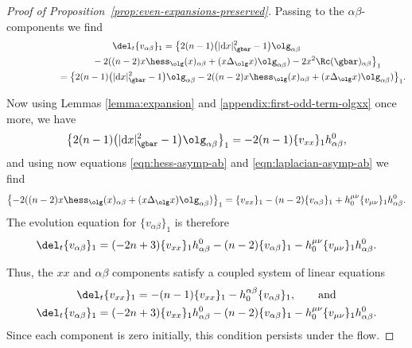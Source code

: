 \begin{proof}[Proof of Proposition~\ref{prop:even-expansions-preserved}]
Passing to the $\alpha \beta$-components we find
\begin{gather*}
\del_t \{ v_{\alpha \beta} \}_{1} =\big\{ 2 (n-1) \big(|{\rm d}x|^2_{\gbar} -1\big) \olg_{{\alpha \beta}} \\
\hphantom{\del_t \{ v_{\alpha \beta} \}_{1} =}{} -2 ( (n-2) x \hess_{\olg} (x)_{{\alpha \beta}} + (x \Delta_{\olg} x) \olg_{{\alpha \beta}} ) -2 x^2 \Rc(\gbar)_{{\alpha \beta}}\big\}_1 \nonumber \\
\hphantom{\del_t \{ v_{\alpha \beta} \}_{1}}{} =\big\{ 2 (n-1)\big(|{\rm d}x|^2_{\gbar} -1\big)\olg_{{\alpha \beta}} -2 ( (n-2) x \hess_{\olg} (x)_{{\alpha \beta}} + (x \Delta_{\olg} x) \olg_{{\alpha \beta}} )\big\}_1.
\end{gather*}

Now using Lemmas \ref{lemma:expansion} and \ref{appendix:first-odd-term-olgxx} once more, we have
\begin{gather*}
\big\{ 2 (n-1) \big(|{\rm d}x|^2_{\gbar} -1\big) \olg_{{\alpha \beta}} \big\}_1 = -2(n-1)\{v_{xx}\}_1 h^0_{\alpha \beta},
\end{gather*}
and using now equations \eqref{eqn:hess-asymp-ab} and \eqref{eqn:laplacian-asymp-ab} we find
\begin{gather*}
\big\{{-}2 ((n-2) x \hess_{\olg} (x)_{{\alpha \beta}} + (x \Delta_{\olg} x) \olg_{{\alpha \beta}} ) \big\}_1 = \{v_{xx}\}_1 - (n-2) \{v_{\alpha \beta}\}_1 + h_0^{\mu \nu} \{v_{\mu\nu}\}_1 h^0_{\alpha \beta}.
\end{gather*}
The evolution equation for $\{v_{\alpha \beta}\}_1$ is therefore
\begin{gather*}
\del_t \{v_{\alpha \beta}\}_1 = (-2n+3)\{v_{xx}\}_1 h^0_{\alpha \beta} - (n-2) \{v_{\alpha \beta}\}_1 - h_0^{\mu \nu} \{v_{\mu\nu}\}_1 h^0_{\alpha \beta}.
\end{gather*}

Thus, the $xx$ and $\alpha\beta$ components satisfy a coupled system of linear equations
\begin{gather*}
\del_t \{ v_{xx} \}_{1} = -(n-1) \{v_{xx}\}_1 - h_0^{\alpha \beta} \{v_{\alpha \beta}\}_{1}, \qquad \mbox{and}\\
\del_t \{v_{\alpha \beta}\}_1 = (-2n+3)\{v_{xx}\}_1 h^0_{\alpha \beta} - (n-2) \{v_{\alpha \beta}\}_1 - h_0^{\mu \nu} \{v_{\mu\nu}\}_1 h^0_{\alpha \beta}.
\end{gather*}
Since each component is zero initially, this condition persists under the flow.


\end{proof}
